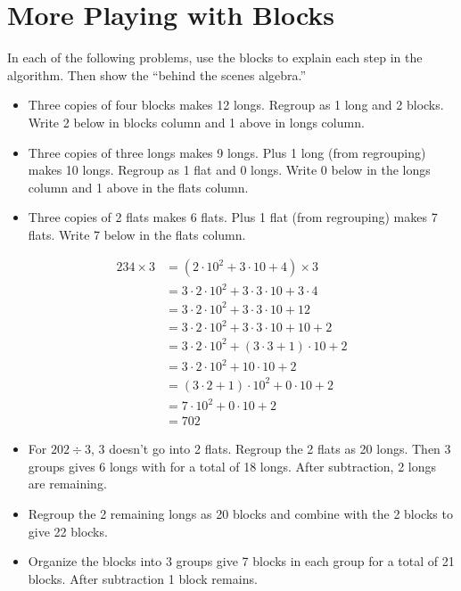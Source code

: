 \newpage
\section{More Playing with Blocks}\label{A:B2} 

\begin{teachingnote}
In each of the following problems, use the blocks to explain each step in the algorithm.  Then show the ``behind the scenes algebra.''


\begin{itemize}
\item Three copies of four blocks makes 12 longs.  Regroup as 1 long and 2 blocks. Write 2 below in blocks column and 1 above in longs column.
\item Three copies of three longs makes 9 longs.  Plus 1 long (from regrouping) makes 10 longs.  Regroup as 1 flat and 0 longs.  Write 0 below in the longs column and 1 above in the flats column.  
\item Three copies of 2 flats makes 6 flats.  Plus 1 flat (from regrouping) makes 7 flats.  Write 7 below in the flats column.  
\end{itemize}

\begin{align*}
234 \times 3 & = (2\cdot 10^2 + 3\cdot 10 + 4)\times 3 \\
&= 3\cdot 2\cdot 10^2 + 3\cdot 3\cdot 10 + 3\cdot 4 \\
&= 3\cdot 2\cdot 10^2 + 3\cdot 3\cdot 10 + 12 \\
&= 3\cdot 2\cdot 10^2 + 3\cdot 3\cdot 10 + 10 + 2\\
&= 3\cdot 2\cdot 10^2 + (3\cdot 3 + 1)\cdot 10 + 2\\
&= 3\cdot 2\cdot 10^2 + 10 \cdot 10 + 2\\
&= (3\cdot 2 + 1) \cdot 10^2 + 0 \cdot 10 + 2\\
&= 7\cdot 10^2 + 0 \cdot 10 + 2\\
&=702
\end{align*}

\begin{itemize}
\item For $202\div 3$, 3 doesn't go into 2 flats.  Regroup the 2 flats as 20 longs.  Then 3 groups gives 6 longs with for a total of 18 longs.  After subtraction, 2 longs are remaining. 
\item Regroup the 2 remaining longs as 20 blocks and combine with the 2 blocks to give 22 blocks.  
\item Organize the blocks into 3 groups give 7 blocks in each group for a total of 21 blocks.  After subtraction 1 block remains.  
\end{itemize}

\end{teachingnote}




